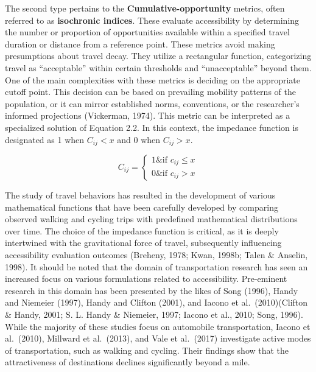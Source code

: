 \documentclass[
11pt, %
oneside, %
english, %
singlespacing, %
]{macthesis} %
\begin{document}
The second type pertains to the \textbf{Cumulative-opportunity} metrics, often referred to as \textbf{isochronic indices}. These evaluate accessibility by determining the number or proportion of opportunities available within a specified travel duration or distance from a reference point. These metrics avoid making presumptions about travel decay. They utilize a rectangular function, categorizing travel as ``acceptable'' within certain thresholds and ``unacceptable'' beyond them. One of the main complexities with these metrics is deciding on the appropriate cutoff point. This decision can be based on prevailing mobility patterns of the population, or it can mirror established norms, conventions, or the researcher's informed projections (Vickerman, 1974). This metric can be interpreted as a specialized solution of Equation 2.2. In this context, the impedance function is designated as 1 when \(C_{ij}< x\) and 0 when \(C_{ij} > x\).

\begin{equation}
C_{ij} =
\begin{cases}
  1 \& \text{if } c_{ij} \le x \\
  0 \& \text{if } c_{ij} > x
\end{cases}
\label{eq:Rectangular form of impedance function}
\end{equation}

The study of travel behaviors has resulted in the development of various mathematical functions that have been carefully developed by comparing observed walking and cycling trips with predefined mathematical distributions over time. The choice of the impedance function is critical, as it is deeply intertwined with the gravitational force of travel, subsequently influencing accessibility evaluation outcomes (Breheny, 1978; Kwan, 1998b; Talen \& Anselin, 1998). It should be noted that the domain of transportation research has seen an increased focus on various formulations related to accessibility. Pre-eminent research in this domain has been presented by the likes of Song (1996), Handy and Niemeier (1997), Handy and Clifton (2001), and Iacono et al.~(2010)(Clifton \& Handy, 2001; S. L. Handy \& Niemeier, 1997; Iacono et al., 2010; Song, 1996). While the majority of these studies focus on automobile transportation, Iacono et al.~(2010), Millward et al.~(2013), and Vale et al.~(2017) investigate active modes of transportation, such as walking and cycling. Their findings show that the attractiveness of destinations declines significantly beyond a mile.
\end{document}
